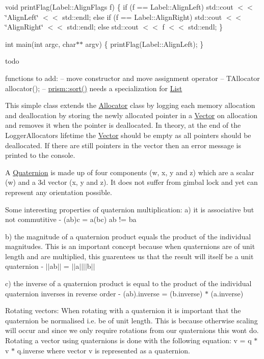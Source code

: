 void print\+Flag(\+Label\+::\+Align\+Flags f) \{ if (f == Label\+::\+Align\+Left) std\+::cout $<$$<$ \char`\"{}\+Align\+Left\char`\"{} $<$$<$ std\+::endl; else if (f == Label\+::\+Align\+Right) std\+::cout $<$$<$ \char`\"{}\+Align\+Right\char`\"{} $<$$<$ std\+::endl; else std\+::cout $<$$<$ f $<$$<$ std\+::endl; \}

int main(int argc, char$\ast$$\ast$ argv) \{ print\+Flag(\+Label\+::\+Align\+Left); \}

todo

functions to add\+: -- move constructor and move assignment operator -- T\+Allocator allocator(); -- \hyperlink{namespaceprism_addfe9ea0146b59b2b16adee4cd2220b9}{prism\+::sort()} needs a specialization for \hyperlink{classprism_1_1_list}{List}

This simple class extends the \hyperlink{classprism_1_1_allocator}{Allocator} class by logging each memory allocation and deallocation by storing the newly allocated pointer in a \hyperlink{classprism_1_1_vector}{Vector} on allocation and removes it when the pointer is deallocated. In theory, at the end of the Logger\+Allocator\textquotesingle{}s lifetime the \hyperlink{classprism_1_1_vector}{Vector} should be empty as all pointers should be deallocated. If there are still pointers in the vector then an error message is printed to the console.

A \hyperlink{classprism_1_1_quaternion}{Quaternion} is made up of four components (w, x, y and z) which are a scalar (w) and a 3d vector (x, y and z). It does not suffer from gimbal lock and yet can represent any orientation possible.

Some interesting properties of quaternion multiplication\+: a) it is associative but not commutitive -\/ (ab)c = a(bc) ab != ba

b) the magnitude of a quaternion product equals the product of the individual magnitudes. This is an important concept because when quaternions are of unit length and are multiplied, this guarentees us that the result will itself be a unit quaternion -\/ $\vert$$\vert$ab$\vert$$\vert$ = $\vert$$\vert$a$\vert$$\vert$$\vert$$\vert$b$\vert$$\vert$

c) the inverse of a quaternion product is equal to the product of the individual quaternion inverses in reverse order -\/ (ab).inverse = (b.\+inverse) $\ast$ (a.\+inverse)

Rotating vectors\+: When rotating with a quaternion it is important that the quaternion be normalised i.\+e. be of unit length. This is because otherwise scaling will occur and since we only require rotations from our quaternions this won\textquotesingle{}t do. Rotating a vector using quaternions is done with the following equation\+: v\textquotesingle{} = q $\ast$ v $\ast$ q.\+inverse where vector v is represented as a quaternion.

